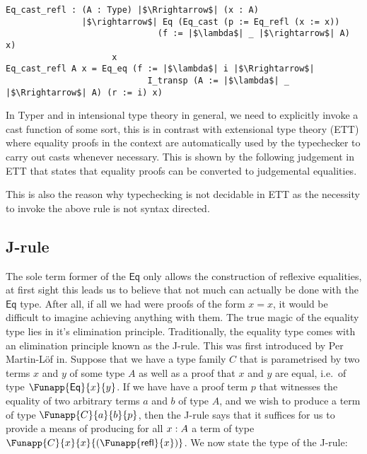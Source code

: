 \documentclass[12pt,twoside,maitrise]{dms}
\theoremstyle{definition}
\numberwithin{equation}{section}
\numberwithin{table}{chapter}
\numberwithin{figure}{chapter}
\newcommand\kw[1] {\textsf{#1}}
\begin{document}
\begin{verbatim}
Eq_cast_refl : (A : Type) |$\Rrightarrow$| (x : A)
               |$\rightarrow$| Eq (Eq_cast (p := Eq_refl (x := x))
                              (f := |$\lambda$| _ |$\rightarrow$| A) x)
                     x
Eq_cast_refl A x = Eq_eq (f := |$\lambda$| i |$\Rrightarrow$|
                            I_transp (A := |$\lambda$| _ |$\Rrightarrow$| A) (r := i) x)
\end{verbatim}


In Typer and in intensional type theory in general, we need to explicitly invoke
a cast function of some sort, this is in contrast with extensional type theory
(ETT)\cite{martin1982constructive} where equality proofs in the context are
automatically used by the typechecker to carry out casts whenever necessary.
This is shown by the following judgement in ETT that states that equality proofs
can be converted to judgemental equalities.

\begin{prooftree*}
  \hypo{\oftype{\ctx}{t}{\Funapp{\kw{Eq}}{a}{b}}}
\end{prooftree*}

This is also the reason why typechecking is not decidable in ETT as the
necessity to invoke the above rule is not syntax directed.


\subsection*{J-rule}\label{subsec:j-rule}
The sole term former of the $\kw{Eq}$ only allows the construction of reflexive
equalities, at first sight this leads us to believe that not much can actually
be done with the $\kw{Eq}$ type. After all, if all we had were proofs of the
form $x = x$, it would be difficult to imagine achieving anything with them. The
true magic of the equality type lies in it's elimination principle.
Traditionally, the equality type comes with an elimination principle known as
the J-rule. This was first introduced by Per Martin-Löf
in\cite{martin1975intuitionistic}. Suppose that we have a type family $C$ that
is parametrised by two terms $x$ and $y$ of some type $A$ as well as a proof
that $x$ and $y$ are equal, i.e.\ of type $\Funapp{\kw{Eq}}{x}{y}$. If we have
have a proof term $p$ that witnesses the equality of two arbitrary terms $a$ and
$b$ of type $A$, and we wish to produce a term of type $\Funapp{C}{a}{b}{p}$,
then the J-rule says that it suffices for us to provide a means of producing for
all $\oftype{x}{A}$ a term of type $\Funapp{C}{x}{x}{(\Funapp{\kw{refl}}{x})}$.
We now state the type of the J-rule:
\end{document}

